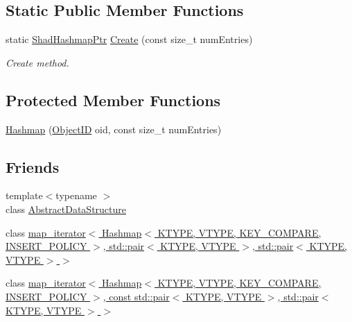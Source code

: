 \subsection*{Static Public Member Functions}
\begin{DoxyCompactItemize}
\item 
static \hyperlink{classshad_1_1Hashmap_a5d013a5199b5745a1877b321af1b86ee}{Shad\-Hashmap\-Ptr} \hyperlink{classshad_1_1Hashmap_a304075c88faf0d3eff16c8a6b380138c}{Create} (const size\-\_\-t num\-Entries)
\begin{DoxyCompactList}\small\item\em Create method. \end{DoxyCompactList}\end{DoxyCompactItemize}
\subsection*{Protected Member Functions}
\begin{DoxyCompactItemize}
\item 
\hyperlink{classshad_1_1Hashmap_a8b729b8e8fe6186be91856998b29ef70}{Hashmap} (\hyperlink{classshad_1_1Hashmap_a1f10a3b0cce639008b5b9444eb167f8b}{Object\-I\-D} oid, const size\-\_\-t num\-Entries)
\end{DoxyCompactItemize}
\subsection*{Friends}
\begin{DoxyCompactItemize}
\item 
{\footnotesize template$<$typename $>$ }\\class \hyperlink{classshad_1_1Hashmap_ab18afa4496cc863ddc11bab94b2adf57}{Abstract\-Data\-Structure}
\item 
class \hyperlink{classshad_1_1Hashmap_a9f6643e9369026a8c41dff0b7bca9e4b}{map\-\_\-iterator$<$ Hashmap$<$ K\-T\-Y\-P\-E, V\-T\-Y\-P\-E, K\-E\-Y\-\_\-\-C\-O\-M\-P\-A\-R\-E, I\-N\-S\-E\-R\-T\-\_\-\-P\-O\-L\-I\-C\-Y $>$, std\-::pair$<$ K\-T\-Y\-P\-E, V\-T\-Y\-P\-E $>$, std\-::pair$<$ K\-T\-Y\-P\-E, V\-T\-Y\-P\-E $>$ $>$}
\item 
class \hyperlink{classshad_1_1Hashmap_a901992501a956914085e608ae303244f}{map\-\_\-iterator$<$ Hashmap$<$ K\-T\-Y\-P\-E, V\-T\-Y\-P\-E, K\-E\-Y\-\_\-\-C\-O\-M\-P\-A\-R\-E, I\-N\-S\-E\-R\-T\-\_\-\-P\-O\-L\-I\-C\-Y $>$, const std\-::pair$<$ K\-T\-Y\-P\-E, V\-T\-Y\-P\-E $>$, std\-::pair$<$ K\-T\-Y\-P\-E, V\-T\-Y\-P\-E $>$ $>$}
\end{DoxyCompactItemize}
